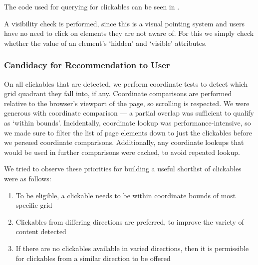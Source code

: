 \documentclass[11pt,openright,a4paper]{report}
\begin{document}
The code used for querying for clickables can be seen in .

A visibility check is performed, since this is a visual pointing system and users have no need to click on elements they are not aware of. For this we simply check whether the value of an element's `hidden' and `visible' attributes.

\subsubsection{Candidacy for Recommendation to User}
On all clickables that are detected, we perform coordinate tests to detect which grid quadrant they fall into, if any. Coordinate comparisons are performed relative to the browser's viewport of the page, so scrolling is respected. We were generous with coordinate comparison --- a partial overlap was sufficient to qualify as `within bounds'. Incidentally, coordinate lookup was performance-intensive, so we made sure to filter the list of page elements down to just the clickables before we persued coordinate comparisons. Additionally, any coordinate lookups that would be used in further comparisons were cached, to avoid repeated lookup.

We tried to observe these priorities for building a useful shortlist of clickables were as follows:

\begin{enumerate}
\item To be eligible, a clickable needs to be within coordinate bounds of most specific grid
\item Clickables from differing directions are preferred, to improve the variety of content detected
\item If there are no clickables available in varied directions, then it is permissible for clickables from a similar direction to be offered
\end{enumerate}
\end{document}
